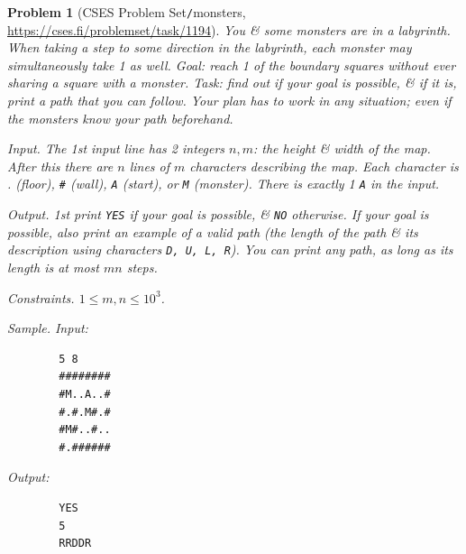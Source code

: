 \documentclass[oneside]{book}
\newtheorem{problem}{Problem}
\begin{document}
\begin{problem}[CSES Problem Set{\tt/}monsters, \url{https://cses.fi/problemset/task/1194}]
	You \& some monsters are in a labyrinth. When taking a step to some direction in the labyrinth, each monster may simultaneously take 1 as well. Goal: reach 1 of the boundary squares without ever sharing a square with a monster. Task: find out if your goal is possible, \& if it is, print a path that you can follow. Your plan has to work in any situation; even if the monsters know your path beforehand.
	\item {\sf Input.} The 1st input line has 2 integers $n,m$: the height \& width of the map. After this there are $n$ lines of $m$ characters describing the map. Each character is . (floor), {\tt\#} (wall), {\tt A} (start), or {\tt M} (monster). There is exactly 1 {\tt A} in the input.
	\item {\sf Output.} 1st print {\tt YES} if your goal is possible, \& {\tt NO} otherwise. If your goal is possible, also print an example of a valid path (the length of the path \& its description using characters {\tt D, U, L, R}). You can print any path, as long as its length is at most $mn$ steps.
	\item {\sf Constraints.} $1\le m,n\le10^3$.
	\item {\sf Sample.} Input:
	\begin{verbatim}
		5 8
		########
		#M..A..#
		#.#.M#.#
		#M#..#..
		#.######
	\end{verbatim}
	Output:
	\begin{verbatim}
		YES
		5
		RRDDR
	\end{verbatim}
\end{problem}
\end{document}
